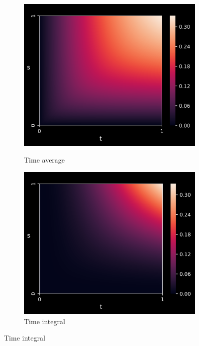 \begin{figure}[t]%
\caption{Covariance kernels (top) and eigenfunctions (bottom).}
\vspace{-4mm}
\begin{subfigure}[b]{0.32\textwidth}
    \centering
    \caption{Time average}
    \includegraphics[scale =0.38]{KL/Figures/KLAverageKernel.png}
    \label{fig:AvgK}
\end{subfigure}
\begin{subfigure}[b]{0.32\textwidth}
    \centering
    \caption{Time integral}
    \includegraphics[scale =0.38]{KL/Figures/KLIntegralKernel.png}

\end{subfigure}
\end{figure}

